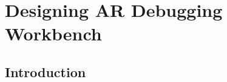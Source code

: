 \documentclass [11pt, proquest] {uwthesis}[2020/02/24]
\begin{document}
 
 
\chapter{Designing AR Debugging Workbench}

\section{Introduction}
\end{document}
